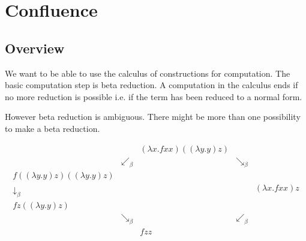 \section{Confluence}

\begin{comment}

    Why: Make lambda calculus really a model of computation. Result (i.e. a
    term in normal form) is independent of the reduction sequence.

    Goal: Uniqueness of normal forms and beta equivalent terms have a common
    reduct. Corollaries: Equivalent binders have equivalent subterms and binders
    cannot reduce to be beta equivalent with sorts or variables.

    Basic Property: Beta reduction is confluent.


    Prove of confluence:

    - Definition via diamonds

    - Diamond between a relation and its reflexive transitive closure proves the
    confluence of the relation.

    - Parallel beta reduction is a diamond between beta reduction and its
    reflexive transitive closure.


\end{comment}




\subsection{Overview}

We want to be able to use the calculus of constructions for computation.
The basic computation step is beta reduction. A computation in the calculus ends
if no more reduction is possible i.e. if the term has been reduced to a normal
form.

However beta reduction is ambiguous. There might be more than one possibility to
make a beta reduction.

\begin{example}
    \label{ex:Confluence}
    $$
    \begin{array}{cccccc}
        & & (\lambda x. f x x) ((\lambda y.y) z)
        \\
        & \swarrow_{\beta}
        & & \searrow_\beta
        \\
        f ((\lambda y.y) z) ((\lambda y.y) z)
        \\
        \downarrow_\beta
        & & & & (\lambda x . f x x) z
        \\
        f z ((\lambda y.y) z)
        \\
        & \searrow_\beta
        & &  \swarrow_\beta
        \\
        & & f z z
    \end{array}
    $$
\end{example}

